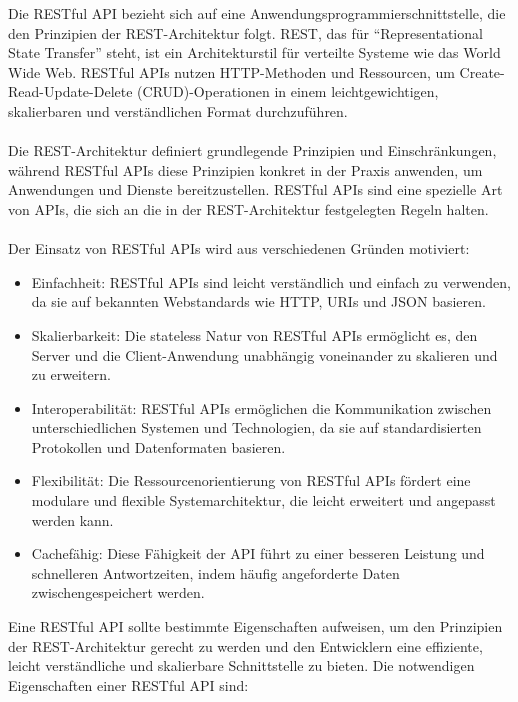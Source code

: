 \documentclass[../vs-script-first-v01.tex]{subfiles}
\begin{document}
Die RESTful API bezieht sich auf eine Anwendungsprogrammierschnittstelle, die den Prinzipien der REST-Architektur folgt. REST, das für \enquote{Representational State Transfer} steht, ist ein Architekturstil für verteilte Systeme wie das World Wide Web. RESTful APIs nutzen HTTP-Methoden und Ressourcen, um Create-Read-Update-Delete (CRUD)-Operationen in einem leichtgewichtigen, skalierbaren und verständlichen Format durchzuführen.
\\\\
Die REST-Architektur definiert grundlegende Prinzipien und Einschränkungen, während RESTful APIs diese Prinzipien konkret in der Praxis anwenden, um Anwendungen und Dienste bereitzustellen. RESTful APIs sind eine spezielle Art von APIs, die sich an die in der REST-Architektur festgelegten Regeln halten.
\\\\
Der Einsatz von RESTful APIs wird aus verschiedenen Gründen motiviert:
\begin{itemize}
\item Einfachheit: RESTful APIs sind leicht verständlich und einfach zu verwenden, da sie auf bekannten Webstandards wie HTTP, URIs und JSON basieren.
\item Skalierbarkeit: Die stateless Natur von RESTful APIs ermöglicht es, den Server und die Client-Anwendung unabhängig voneinander zu skalieren und zu erweitern.
\item Interoperabilität: RESTful APIs ermöglichen die Kommunikation zwischen unterschiedlichen Systemen und Technologien, da sie auf standardisierten Protokollen und Datenformaten basieren.
\item Flexibilität: Die Ressourcenorientierung von RESTful APIs fördert eine modulare und flexible Systemarchitektur, die leicht erweitert und angepasst werden kann.
\item Cachefähig: Diese Fähigkeit der API führt zu einer besseren Leistung und schnelleren Antwortzeiten, indem häufig angeforderte Daten zwischengespeichert werden.
\end{itemize}
Eine RESTful API sollte bestimmte Eigenschaften aufweisen, um den Prinzipien der REST-Architektur gerecht zu werden und den Entwicklern eine effiziente, leicht verständliche und skalierbare Schnittstelle zu bieten. Die notwendigen Eigenschaften einer RESTful API sind:
\end{document}
